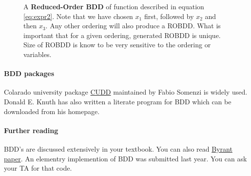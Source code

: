    \begin{figure}[h]
    \centering
    \caption{\small A \textbf{Reduced-Order BDD} of function described in equation
        \ref{eq:expr2}. Note that we have chosen $x_1$ first, followed by $x_2$
        and then $x_3$. Any other ordering will also produce a ROBDD. What is
        important that for a given ordering, generated ROBDD is unique. Size of ROBDD
        is know to be very sensitive to the ordering or variables.}
  \end{figure}

  \paragraph{BDD packages}

  Colarado university package \href{http://vlsi.colorado.edu/~fabio/CUDD/}{CUDD}
  maintained by Fabio Somenzi is widely used. Donald E. Knuth has also
  written a literate program for BDD which can be downloaded from his homepage. 

  \paragraph{Further reading}

  BDD's are discussed extensively in your textbook. You can also
  read \href{www.cs.cmu.edu/~bryant/pubdir/ieeetc86.pdf}{Byrant paper}. An
  elementry implemention of BDD was submitted last year. You can ask your TA for
  that code.


